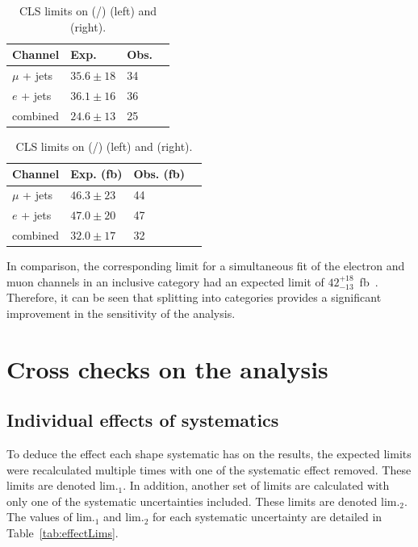 \begin{table}[ht!]
\centering
\begin{tabular}{| l | l | l | p{1cm} |}
 \hline 
 Channel & Exp.  &Obs. \\
   \hline
 $\mu$ + jets & $35.6\pm 18$ & 34 \\
  \hline
$e$ + jets &  $36.1\pm16$  & 36  \\
\hline
 combined & $24.6\pm13$  & 25   \\
\hline
\end{tabular}
\hspace{0.5cm}
\begin{tabular}{| l | l | l | p{1cm} |}
 \hline 
 Channel & Exp. (fb) &Obs. (fb) \\
   \hline
 $\mu$ + jets & $46.3\pm23$ & 44 \\
  \hline
$e$ + jets &  $47.0\pm20$  & 47  \\
\hline
 combined & $32.0\pm17$  & 32   \\
\hline
\end{tabular}
\caption{CLS limits on (\sigmatttt/\sigmattttSM) (left) and \sigmatttt (right). }
\label{tab:lims}
\end{table}

In comparison, the corresponding limit for a simultaneous fit of the electron and muon channels in an inclusive \njets category had an expected limit of  $42^{+18}_{-13}$~fb~\cite{CMS-PAS-TOP-13-012}. Therefore, it can be seen that splitting into \njets categories provides a significant improvement in the sensitivity of the analysis.

\section{Cross checks on the analysis\label{studies8}}

\subsection{Individual effects of systematics \label{sec:effectsys}}

To deduce the effect each shape systematic has on the results, the expected limits were recalculated multiple times with one of the systematic effect removed. These limits are denoted lim.$_{1}$. In addition, another set of limits are calculated with only one of the systematic uncertainties included. These limits are denoted lim.$_{2}$. The values of lim.$_{1}$ and lim.$_{2}$ for each systematic uncertainty are detailed in Table~\ref{tab:effectLims}.

